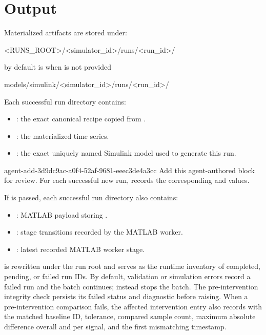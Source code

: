 \documentclass[11pt]{article}
\begin{document}
\section*{Output}
Materialized artifacts are stored under:
\begin{DocCode}
<RUNS_ROOT>/<simulator_id>/runs/<run_id>/
\end{DocCode}

by default  is  when  is not provided
\begin{DocCode}
models/simulink/<simulator_id>/runs/<run_id>/
\end{DocCode}





Each successful run directory contains:

\begin{itemize}
\item {}: the exact canonical recipe copied from .
\item {}: the materialized time series.
\item {}: the exact uniquely named Simulink model used to generate this run.
\end{itemize}
\agentProposedEdit
  {agent-add-3d9dc9ac-a0f4-52af-9681-eeec3de4a3cc}
  {Add this agent-authored block for review.}
  {}
  {For each successful new run,  records the corresponding  and  values.}

If  is passed, each successful run directory also contains:

\begin{itemize}
\item {}: MATLAB payload storing .
\item {}: stage transitions recorded by the MATLAB worker.
\item {}: latest recorded MATLAB worker stage.
\end{itemize}

 is rewritten under the run root and serves as the runtime inventory of completed, pending, or failed run IDs.
By default, validation or simulation errors record a failed run and the batch continues;  instead stops the batch.
The pre-intervention integrity check persists its failed status and diagnostic before raising.
When a pre-intervention comparison fails, the affected intervention entry also records
 with the matched baseline ID, tolerance, compared sample count,
maximum absolute difference overall and per signal, and the first mismatching timestamp.
\end{document}

